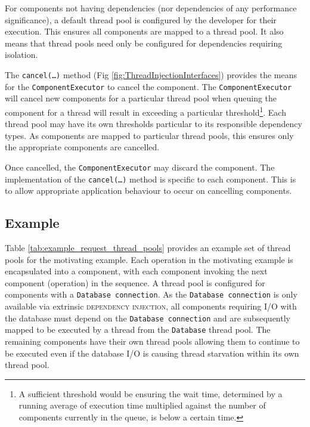 \documentclass[prodmode]{style/acmlarge}
\begin{document}
For components not having dependencies (nor dependencies of any
performance significance), a default thread pool is configured by the developer
for their execution.  This ensures all components are mapped to a
thread pool.  It also means that thread pools need only be configured for
dependencies requiring isolation.

The \texttt{cancel(\ldots)} method (Fig \ref{fig:ThreadInjectionInterfaces})
provides the means for the \texttt{ComponentExecutor} to cancel the component. 
The \texttt{ComponentExecutor} will cancel new components for a particular
thread pool when queuing the component for a thread will result in exceeding a
particular threshold\footnote{A sufficient threshold would be ensuring the wait
time, determined by a running average of execution time multiplied against the
number of components currently in the queue, is below a certain time.}.  Each
thread pool may have its own thresholds particular to its responsible dependency
types.  As components are mapped to particular thread pools, this ensures only
the appropriate components are cancelled.

Once cancelled, the \texttt{ComponentExecutor} may discard the component.  The
implementation of the \texttt{can\-cel(\ldots)} method is specific to each
component.  This is to allow appropriate application behaviour to occur on
cancelling components.


\subsection{Example}

Table \ref{tab:example_request_thread_pools} provides an example set of thread
pools for the motivating example.  Each operation in the motivating example is
encapsulated into a component, with each component invoking the next component
(operation) in the sequence.  A thread pool is configured for components with a
\texttt{Database connection}.  As the \texttt{Database connection} is only
available via extrinsic \textsc{dependency injection}, all components requiring
I/O with the database must depend on the \texttt{Database connection} and are
subsequently mapped to be executed by a thread from the \texttt{Database} thread
pool.  The remaining components have their own thread pools allowing them to
continue to be executed even if the database I/O is causing thread starvation
within its own thread pool.
\end{document}
